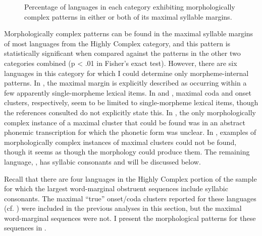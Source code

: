 \begin{figure}  
\caption{\label{fig:3.7} Percentage of languages in each category exhibiting morphologically complex patterns in either or both of its maximal syllable margins.}
\end{figure}

  Morphologically complex patterns can be found in the maximal syllable margins of most languages from the Highly Complex category, and this pattern is statistically significant when compared against the patterns in the other two categories combined (p < .01 in Fisher’s exact test). However, there are six languages in this category for which I could determine only morpheme-internal patterns. In , the maximal margin is explicitly described as occurring within a few apparently single-morpheme lexical items. In  and , maximal coda and onset clusters, respectively, seem to be limited to single-morpheme lexical items, though the references consulted do not explicitly state this. In , the only morphologically complex instance of a maximal cluster that could be found was in an abstract phonemic transcription for which the phonetic form was unclear. In , examples of morphologically complex instances of maximal clusters could not be found, though it seems as though the morphology could produce them. The remaining language, , has syllabic consonants and will be discussed below.

  Recall that there are four languages in the Highly Complex portion of the sample for which the largest word-marginal obstruent sequences include syllabic consonants. The maximal ``true'' onset/coda clusters reported for these languages (cf. ) were included in the previous analyses in this section, but the maximal word-marginal sequences were not. I present the morphological patterns for these sequences in .

